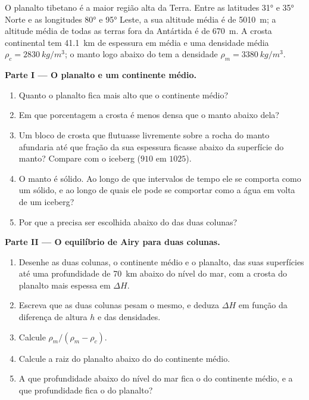 \begin{problem}
\label{pb:g11:lithosphere-asthenosphere:1}
O planalto tibetano é a maior região alta da Terra. Entre as latitudes
\ang{31} e \ang{35} Norte e as longitudes \ang{80} e \ang{95} Leste, a sua
altitude média é de \qty{5010}{m}; a altitude média de todas as terras fora
da Antártida é de \qty{670}{m}. A crosta continental tem \qty{41.1}{km} de
espessura em média e uma densidade média $\rho_c = \qty{2830}{kg/m^3}$; o
manto logo abaixo do  tem a densidade $\rho_m = \qty{3380}{kg/m^3}$.

\medskip
\noindent\textbf{Parte I --- O planalto e um continente médio.}
\begin{enumerate}
  \item Quanto o planalto fica mais alto que o continente médio?
  \item Em que porcentagem a crosta é menos densa que o manto abaixo dela?
  \item Um bloco de crosta que flutuasse livremente sobre a rocha do manto
        afundaria até que fração da sua espessura ficasse abaixo da
        superfície do manto? Compare com o iceberg ($910$ em $1025$).
  \item O manto é sólido. Ao longo de que intervalos de tempo ele se comporta
        como um sólido, e ao longo de quais ele pode se comportar como a
        água em volta de um iceberg?
  \item Por que a  precisa ser escolhida abaixo
        do  das duas colunas?
\end{enumerate}

\medskip
\noindent\textbf{Parte II --- O equilíbrio de Airy para duas colunas.}
\begin{enumerate}[resume]
  \item Desenhe as duas colunas, o continente médio e o planalto, das suas
        superfícies até uma profundidade de \qty{70}{km} abaixo do nível do
        mar, com a crosta do planalto mais espessa em $\Delta H$.
  \item Escreva que as duas colunas pesam o mesmo, e deduza $\Delta H$ em
        função da diferença de altura $h$ e das densidades.
  \item Calcule $\rho_m/(\rho_m - \rho_c)$.
  \item Calcule a raiz do planalto abaixo do  do continente médio.
  \item A que profundidade abaixo do nível do mar fica o  do continente
        médio, e a que profundidade fica o do planalto?
\end{enumerate}


\end{problem}
